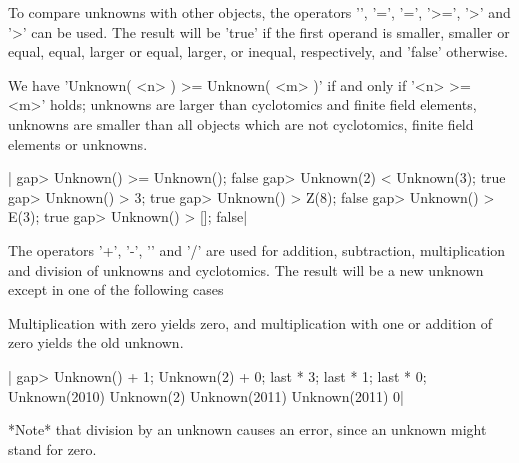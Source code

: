 To compare  unknowns with  other objects,  the operators  '\<', '\<=',
'=', '>=',  '>' and '\<>' can be used.  The  result will  be 'true' if
the first  operand is  smaller,  smaller or equal,  equal,  larger  or
equal, larger, or inequal, respectively, and 'false' otherwise.

We have 'Unknown( <n> ) >= Unknown( <m> )' if and only if '<n> >= <m>'
holds; unknowns are larger than cyclotomics and finite field elements,
unknowns  are  smaller than  all  objects  which are not  cyclotomics,
finite field elements or unknowns.

|    gap> Unknown() >= Unknown();
    false
    gap> Unknown(2) < Unknown(3);
    true
    gap> Unknown() > 3;
    true
    gap> Unknown() > Z(8);
    false
    gap> Unknown() > E(3);
    true
    gap>  Unknown() > [];
    false|


The  operators  '+',  '-',  '\*'  and   '/'  are  used  for  addition,
subtraction, multiplication and division of  unknowns and cyclotomics.
The  result  will be  a  new unknown  except  in one of  the following
cases\:

Multiplication  with zero yields zero, and multiplication  with one or
addition of zero yields the old unknown.

|    gap> Unknown() + 1; Unknown(2) + 0; last * 3; last * 1; last * 0;
    Unknown(2010)
    Unknown(2)
    Unknown(2011)
    Unknown(2011)
    0|

*Note* that division by an unknown causes  an error, since an  unknown
might stand for zero.


